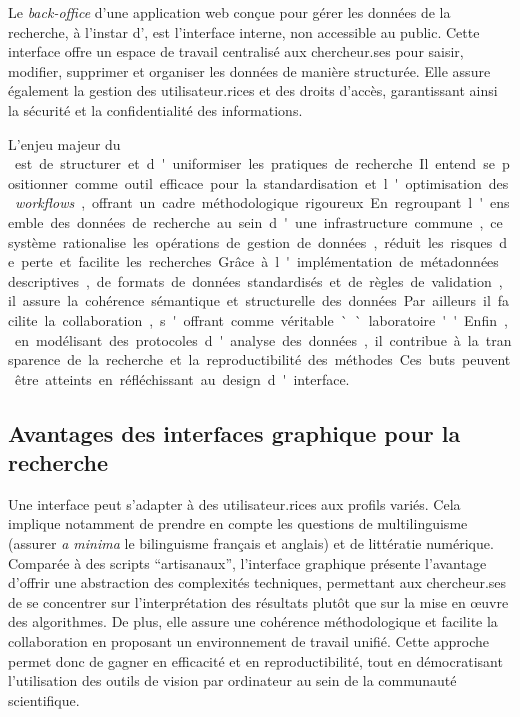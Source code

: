 Le \textit{back-office} d'une application web conçue pour gérer les données de la
recherche, à l'instar d'\aikon, est l'interface interne, non accessible
au public. Cette interface offre un espace de travail centralisé aux
chercheur.ses pour saisir, modifier, supprimer et organiser les données de
manière structurée. Elle assure également la gestion des utilisateur.rices et
des droits d'accès, garantissant ainsi la sécurité et la confidentialité
des informations.

L'enjeu majeur du \si \aikon est de structurer et d'uniformiser les
pratiques de recherche. Il entend se positionner comme outil efficace
pour la standardisation et l'optimisation des \textit{workflows}, offrant un
cadre méthodologique rigoureux. En regroupant l'ensemble des données de
recherche au sein d'une infrastructure commune, ce système rationalise
les opérations de gestion de données, réduit les risques de perte et facilite les recherches. Grâce à l'implémentation de
métadonnées descriptives, de formats de données standardisés et de
règles de validation, il assure la cohérence sémantique et structurelle
des données. Par ailleurs il facilite la collaboration, s'offrant comme
véritable ``laboratoire''. Enfin, en modélisant des protocoles d'analyse
des données, il contribue à la transparence de la recherche et la
reproductibilité des méthodes.

Ces buts peuvent être atteints en réfléchissant au design d'interface.

\hypertarget{avantages-des-interfaces-graphique-pour-la-recherche}{%
\subsection{Avantages des interfaces graphique pour la
recherche}\label{avantages-des-interfaces-graphique-pour-la-recherche}}

Une interface peut s'adapter à des utilisateur.rices aux profils variés.
Cela implique notamment de prendre en compte les questions de
multilinguisme (assurer \emph{a minima} le bilinguisme français et
anglais) et de littératie numérique. Comparée à des scripts
``artisanaux'', l'interface graphique présente l'avantage d'offrir une
abstraction des complexités techniques, permettant aux chercheur.ses de se
concentrer sur l'interprétation des résultats plutôt que sur la mise en
œuvre des algorithmes. De plus, elle assure une cohérence
méthodologique et facilite la collaboration en proposant un
environnement de travail unifié. Cette approche permet donc de gagner en
efficacité et en reproductibilité, tout en démocratisant l'utilisation
des outils de vision par ordinateur au sein de la communauté
scientifique.

